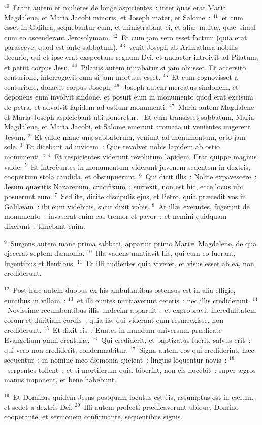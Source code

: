 ${}^{40}$~Erant autem et mulieres de longe aspicientes~: inter quas erat Maria Magdalene, et Maria Jacobi minoris, et Joseph mater, et Salome~:
${}^{41}$~et cum esset in Galil\ae a, sequebantur eum, et ministrabant ei, et ali\ae\ mult\ae , qu\ae\ simul cum eo ascenderant Jerosolymam.
${}^{42}$~Et cum jam sero esset factum (quia erat parasceve, quod est ante sabbatum),
${}^{43}$~venit Joseph ab Arimath\ae a nobilis decurio, qui et ipse erat exspectans regnum Dei, et audacter introivit ad Pilatum, et petiit corpus Jesu.
${}^{44}$~Pilatus autem mirabatur si jam obiisset. Et accersito centurione, interrogavit eum si jam mortuus esset.
${}^{45}$~Et cum cognovisset a centurione, donavit corpus Joseph.
${}^{46}$~Joseph autem mercatus sindonem, et deponens eum involvit sindone, et posuit eum in monumento quod erat excisum de petra, et advolvit lapidem ad ostium monumenti.
${}^{47}$~Maria autem Magdalene et Maria Joseph aspiciebant ubi poneretur.
~\lettrine[lines=10,image=true,loversize=0.05,lraise=-0.03]{E}{}t cum transisset sabbatum, Maria Magdalene, et Maria Jacobi, et Salome emerunt aromata ut venientes ungerent Jesum.
${}^{2}$~Et valde mane una sabbatorum, veniunt ad monumentum, orto jam sole.
${}^{3}$~Et dicebant ad invicem~: Quis revolvet nobis lapidem ab ostio monumenti~?
${}^{4}$~Et respicientes viderunt revolutum lapidem. Erat quippe magnus valde.
${}^{5}$~Et intro\"euntes in monumentum viderunt juvenem sedentem in dextris, coopertum stola candida, et obstupuerunt.
${}^{6}$~Qui dicit illis~: Nolite expavescere~: Jesum qu\ae ritis Nazarenum, crucifixum~: surrexit, non est hic, ecce locus ubi posuerunt eum.
${}^{7}$~Sed ite, dicite discipulis ejus, et Petro, quia pr\ae cedit vos in Galil\ae am~: ibi eum videbitis, sicut dixit vobis.
${}^{8}$~At ill\ae\ exeuntes, fugerunt de monumento~: invaserat enim eas tremor et pavor~: et nemini quidquam dixerunt~: timebant enim.


${}^{9}$~Surgens autem mane prima sabbati, apparuit primo Mari\ae\ Magdalene, de qua ejecerat septem d\ae monia.
${}^{10}$~Illa vadens nuntiavit his, qui cum eo fuerant, lugentibus et flentibus.
${}^{11}$~Et illi audientes quia viveret, et visus esset ab ea, non crediderunt.


${}^{12}$~Post h\ae c autem duobus ex his ambulantibus ostensus est in alia effigie, euntibus in villam~:
${}^{13}$~et illi euntes nuntiaverunt ceteris~: nec illis crediderunt.
${}^{14}$~Novissime recumbentibus illis undecim apparuit~: et exprobravit incredulitatem eorum et duritiam cordis~: quia iis, qui viderant eum resurrexisse, non crediderunt.
${}^{15}$~Et dixit eis~: Euntes in mundum universum pr\ae dicate Evangelium omni creatur\ae .
${}^{16}$~Qui crediderit, et baptizatus fuerit, salvus erit~: qui vero non crediderit, condemnabitur.
${}^{17}$~Signa autem eos qui crediderint, h\ae c sequentur~: in nomine meo d\ae monia ejicient~: linguis loquentur novis~:
${}^{18}$~serpentes tollent~: et si mortiferum quid biberint, non eis nocebit~: super \ae gros manus imponent, et bene habebunt.


${}^{19}$~Et Dominus quidem Jesus postquam locutus est eis, assumptus est in c\ae lum, et sedet a dextris Dei.
${}^{20}$~Illi autem profecti pr\ae dicaverunt ubique, Domino cooperante, et sermonem confirmante, sequentibus signis.
